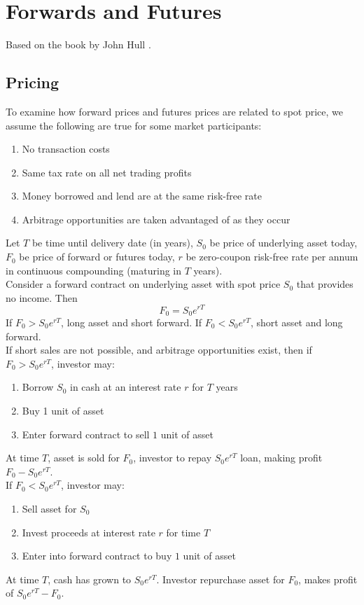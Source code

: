 \section{Forwards and Futures}

Based on the book by John Hull \citep{s7-hulloptions}.

\subsection{Pricing}

To examine how forward prices and futures prices are related to spot price, we assume the following are true for some market participants:
\begin{enumerate}[label=\roman*.]
\setlength{\itemsep}{0pt}
\item No transaction costs
\item Same tax rate on all net trading profits
\item Money borrowed and lend are at the same risk-free rate
\item Arbitrage opportunities are taken advantaged of as they occur
\end{enumerate}

Let $T$ be time until delivery date (in years), $S_0$ be price of underlying asset today, $F_0$ be price of forward or futures today, $r$ be zero-coupon risk-free rate per annum in continuous compounding (maturing in $T$ years).\\

Consider a forward contract on underlying asset with spot price $S_0$ that provides no income. Then
\begin{equation*}
F_0 = S_0 e^{rT} \nonumber
\end{equation*}
If $F_0 > S_0 e^{rT}$, long asset and short forward. If $F_0 < S_0 e^{rT}$, short asset and long forward.\\
If short sales are not possible, and arbitrage opportunities exist, then if $F_0 > S_0 e^{rT}$, investor may:
\begin{enumerate}[label=\arabic*.]
\setlength{\itemsep}{0pt}
\item Borrow $S_0$ in cash at an interest rate $r$ for $T$ years
\item Buy 1 unit of asset
\item Enter forward contract to sell $1$ unit of asset
\end{enumerate}
At time $T$, asset is sold for $F_0$, investor to repay $S_0 e^{rT}$ loan, making profit $F_0 - S_0 e^{rT}$.\\
If $F_0 < S_0 e^{rT}$, investor may:
\begin{enumerate}[label=\arabic*.]
\setlength{\itemsep}{0pt}
\item Sell asset for $S_0$
\item Invest proceeds at interest rate $r$ for time $T$
\item Enter into forward contract to buy $1$ unit of asset
\end{enumerate}
At time $T$, cash has grown to $S_0 e^{rT}$. Investor repurchase asset for $F_0$, makes profit of $S_0 e^{rT} - F_0$.\\

